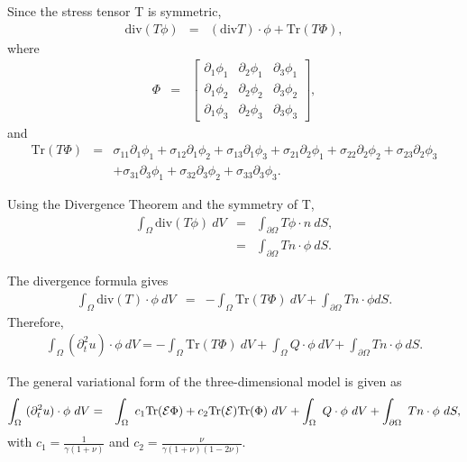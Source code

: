 \documentclass[../../main.tex]{subfiles}ite{VS18}
\begin{document}
Since the stress tensor T is symmetric,
\begin{eqnarray*}
	\textrm{div}(T\phi) & = & (\textrm{div}T)\cdot \phi + \textrm{Tr}(T\Phi),
\end{eqnarray*}
where
\begin{eqnarray*}
	\Phi & = &
	\begin{bmatrix}
		\partial_1 \phi_1 & \partial_2 \phi_1 & \partial_3 \phi_1 \\
		\partial_1 \phi_2 & \partial_2 \phi_2 & \partial_3 \phi_2 \\
		\partial_1 \phi_3 & \partial_2 \phi_3 & \partial_3 \phi_3
	\end{bmatrix},
\end{eqnarray*}
and
\begin{eqnarray*}
	\textrm{Tr}(T\Phi) & = & \sigma_{11} \partial_1\phi_1 + \sigma_{12}\partial_1 \phi_2 + \sigma_{13}\partial_1 \phi_3 + \sigma_{21}\partial_2 \phi_1 + \sigma_{22}\partial_2\phi_2 + \sigma_{23}\partial_2 \phi_3 \nonumber \\ & & + \sigma_{31}\partial_3 \phi_1 + \sigma_{32}\partial_3\phi_2 + \sigma_{33}\partial_3 \phi_3. \label{Trc}
\end{eqnarray*}

Using the Divergence Theorem and the symmetry of T,
\begin{eqnarray*}
	\int_{\Omega} \textrm{div}(T\phi) \ dV & = & \int_{\partial \Omega} T\phi \cdot n \ dS,\\ & = & \int_{\partial \Omega} Tn \cdot \phi \ dS.
\end{eqnarray*}

The divergence formula gives
\begin{eqnarray*}
	\int_{\Omega} \textrm{div}(T)\cdot \phi \ dV & = & -\int_{\Omega} \textrm{Tr}(T\Phi) \ dV + \int_{\partial \Omega} Tn\cdot \phi dS.
\end{eqnarray*}
Therefore,
\begin{align*}
	\int_{\Omega} (\partial_t^2 u)\cdot \phi \ dV = -\int_{\Omega} \textrm{Tr}(T\Phi) \ dV +
	\int_{\Omega} Q\cdot\phi \ dV + \int_{\partial \Omega} Tn\cdot \phi \ dS.
\end{align*}

The general variational form of the three-dimensional model is given as
\begin{eqnarray*}
	\int_\Omega~ (\partial^2_t u) \cdot \phi~dV & = & \int_\Omega~c_1\textrm{Tr}({\cal E}\Phi)+
	c_2\textrm{Tr}({\cal E}) \textrm{Tr}(\Phi) ~dV + \int_\Omega~ Q \cdot \phi~dV +
	\int_{\partial \Omega}~Tn \cdot \phi~dS,
\end{eqnarray*}
with $ \displaystyle c_1 = \frac{1}{\gamma(1+\nu)}$ and $\displaystyle c_2 = \frac{\nu}{\gamma(1+\nu)(1-2\nu)}$.\\
\end{document}

